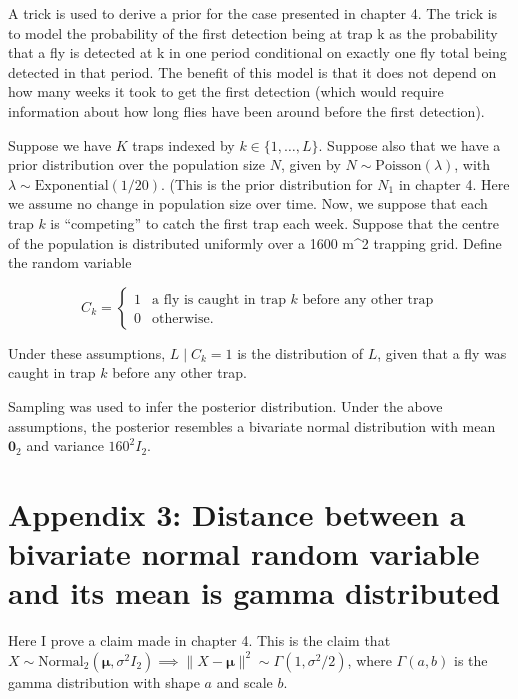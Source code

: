 \documentclass[
  oneside]{book}
\begin{document}
A trick is used to derive a prior for the case presented in chapter 4. The trick is to model the probability of the first detection being at trap k as the probability that a fly is detected at k in one period conditional on exactly one fly total being detected in that period. The benefit of this model is that it does not depend on how many weeks it took to get the first detection (which would require information about how long flies have been around before the first detection).

Suppose we have \(K\) traps indexed by \(k \in \{1, \ldots, L\}\). Suppose also that we have a prior distribution over the population size \(N\), given by \(N \sim \mathrm{Poisson} (\lambda)\), with \(\lambda \sim \mathrm{Exponential(1/20)}\). (This is the prior distribution for \(N_1\) in chapter 4. Here we assume no change in population size over time. Now, we suppose that each trap \(k\) is ``competing'' to catch the first trap each week. Suppose that the centre of the population is distributed uniformly over a 1600 m\^{}2 trapping grid. Define the random variable

\[
C_k = \begin{cases}1 & \text{a fly is caught in trap } k \text{ before any other trap} \\ 0 & \text{otherwise}. \end{cases}
\]

Under these assumptions, \(L \mid C_k = 1\) is the distribution of \(L\), given that a fly was caught in trap \(k\) before any other trap.

Sampling was used to infer the posterior distribution. Under the above assumptions, the posterior resembles a bivariate normal distribution with mean \(\mathbf 0_2\) and variance \(160^2 I_2\).

\hypertarget{appendix-3-distance-between-a-bivariate-normal-random-variable-and-its-mean-is-gamma-distributed}{%
\section{Appendix 3: Distance between a bivariate normal random variable and its mean is gamma distributed}\label{appendix-3-distance-between-a-bivariate-normal-random-variable-and-its-mean-is-gamma-distributed}}

Here I prove a claim made in chapter 4. This is the claim that \(X \sim \mathrm {Normal}_2 (\pmb \mu, \sigma^2 I_2) \implies \lVert X - \pmb \mu \rVert^2 \sim \Gamma(1, \sigma^2/2)\), where \(\Gamma(a, b)\) is the gamma distribution with shape \(a\) and scale \(b\).
\end{document}
